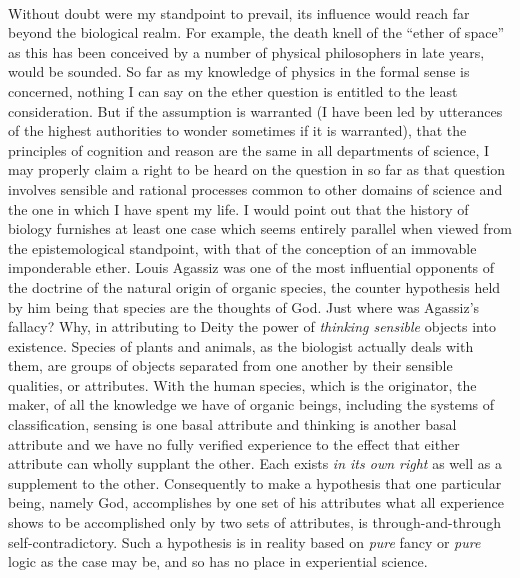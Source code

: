 \documentclass[a4paper, 11pt, oneside, polutonikogreek, english]{article}
\begin{document}
\paragraph{}
Without doubt were my standpoint to prevail, its influence would reach far beyond the biological realm. For example, the death knell of the ``ether of space'' as this has been conceived by a number of physical philosophers in late years, would be sounded. So far as my knowledge of physics in the formal sense is concerned, nothing I can say on the ether question is entitled to the least consideration. But if the assumption is warranted (I have been led by utterances of the highest authorities to wonder sometimes if it is warranted), that the principles of cognition and reason are the same in all departments of science, I may properly claim a right to be heard on the question in so far as that question involves sensible and rational processes common to other domains of science and the one in which I have spent my life. I would point out that the history of biology furnishes at least one case which seems entirely parallel when viewed from the epistemological standpoint, with that of the conception of an immovable imponderable ether. Louis Agassiz was one of the most influential opponents of the doctrine of the natural origin of organic species, the counter hypothesis held by him being that species are the thoughts of God. Just where was Agassiz's fallacy? Why, in attributing to Deity the power of \emph{thinking sensible} objects into existence. Species of plants and animals, as the biologist actually deals with them, are groups of objects separated from one another by their sensible qualities, or attributes. With the human species, which is the originator, the maker, of all the knowledge we have of organic beings, including the systems of classification, sensing is one basal attribute and thinking is another basal attribute and we have no fully verified experience to the effect that either attribute can wholly supplant the other. Each exists \emph{in its own right} as well as a supplement to the other. Consequently to make a hypothesis that one particular being, namely God, accomplishes by one set of his attributes what all experience shows to be accomplished only by two sets of attributes, is through-and-through self-contradictory. Such a hypothesis is in reality based on \emph{pure} fancy or \emph{pure} logic as the case may be, and so has no place in experiential science.
\end{document}
